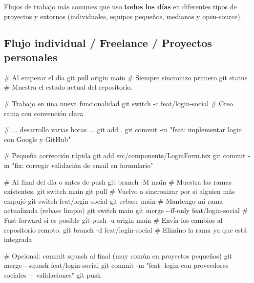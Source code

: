 \documentclass[
  doc,
  floatsintext,
  longtable,
  a4paper,
  nolmodern,
  notxfonts,
  notimes,
  12pt,
  colorlinks=true,linkcolor=blue,citecolor=blue,urlcolor=blue]{apa7}
\newenvironment{Shaded}{\begin{snugshade}}{\end{snugshade}}
\newcommand{\AttributeTok}[1]{\textcolor[rgb]{0.40,0.45,0.13}{#1}}
\newcommand{\CommentTok}[1]{\textcolor[rgb]{0.37,0.37,0.37}{#1}}
\newcommand{\FunctionTok}[1]{\textcolor[rgb]{0.28,0.35,0.67}{#1}}
\newcommand{\NormalTok}[1]{\textcolor[rgb]{0.00,0.23,0.31}{#1}}
\newcommand{\StringTok}[1]{\textcolor[rgb]{0.13,0.47,0.30}{#1}}
\begin{document}
Flujos de trabajo más comunes que uso \textbf{todos los días} en
diferentes tipos de proyectos y entornos (individuales, equipos
pequeños, medianos y open-source).

\subsection{Flujo individual / Freelance / Proyectos
personales}\label{flujo-individual-freelance-proyectos-personales}

\begin{Shaded}
\begin{Highlighting}[]
\CommentTok{\# Al empezar el día}
\FunctionTok{git}\NormalTok{ pull origin main  }\CommentTok{\# Siempre sincronizo primero}
\FunctionTok{git}\NormalTok{ status            }\CommentTok{\# Muestra el estado actual del repositorio.}

\CommentTok{\# Trabajo en una nueva funcionalidad}
\FunctionTok{git}\NormalTok{ switch }\AttributeTok{{-}c}\NormalTok{ feat/login{-}social   }\CommentTok{\# Creo rama con convención clara}

\CommentTok{\# ... desarrollo varias horas ...}
\FunctionTok{git}\NormalTok{ add .}
\FunctionTok{git}\NormalTok{ commit }\AttributeTok{{-}m} \StringTok{"feat: implementar login con Google y GitHub"}

\CommentTok{\# Pequeña corrección rápida}
\FunctionTok{git}\NormalTok{ add src/components/LoginForm.tsx}
\FunctionTok{git}\NormalTok{ commit }\AttributeTok{{-}m} \StringTok{"fix: corregir validación de email en formulario"}

\CommentTok{\# Al final del día o antes de push}
\FunctionTok{git}\NormalTok{ branch }\AttributeTok{{-}M}\NormalTok{ main }\CommentTok{\# Muestra las ramas existentes.}
\FunctionTok{git}\NormalTok{ switch main}
\FunctionTok{git}\NormalTok{ pull                 }\CommentTok{\# Vuelvo a sincronizar por si alguien más empujó}
\FunctionTok{git}\NormalTok{ switch feat/login{-}social}
\FunctionTok{git}\NormalTok{ rebase main          }\CommentTok{\# Mantengo mi rama actualizada (rebase limpio)}
\FunctionTok{git}\NormalTok{ switch main}
\FunctionTok{git}\NormalTok{ merge }\AttributeTok{{-}{-}ff{-}only}\NormalTok{ feat/login{-}social   }\CommentTok{\# Fast{-}forward si es posible}
\FunctionTok{git}\NormalTok{ push }\AttributeTok{{-}u}\NormalTok{ origin main  }\CommentTok{\# Envía los cambios al repositorio remoto.}
\FunctionTok{git}\NormalTok{ branch }\AttributeTok{{-}d}\NormalTok{ feat/login{-}social   }\CommentTok{\# Elimino la rama ya que está integrada}

\CommentTok{\# Opcional: commit squash al final (muy común en proyectos pequeños)}
\FunctionTok{git}\NormalTok{ merge }\AttributeTok{{-}{-}squash}\NormalTok{ feat/login{-}social}
\FunctionTok{git}\NormalTok{ commit }\AttributeTok{{-}m} \StringTok{"feat: login con proveedores sociales + validaciones"}
\FunctionTok{git}\NormalTok{ push}
\end{Highlighting}
\end{Shaded}
\end{document}
